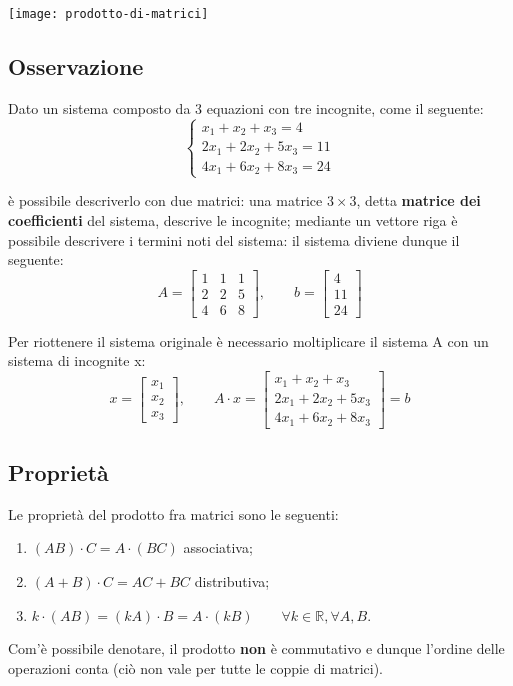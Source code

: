 		\texttt{[image: prodotto-di-matrici]}
		
		\subsection{Osservazione}
			Dato un sistema composto da 3 equazioni con tre incognite, come il seguente:
			$$
			\begin{cases}
				x_1 + x_2 + x_3 = 4 \\
				2x_1 + 2x_2 + 5x_3 = 11 \\
				4x_1 + 6x_2 + 8x_3 = 24 
			\end{cases}
			$$
			
			è possibile descriverlo con due matrici: una matrice $ 3 \times 3 $, detta \textbf{matrice dei coefficienti} del sistema, descrive le incognite; mediante un vettore riga è possibile descrivere i termini noti del sistema: il sistema diviene dunque il seguente:
			$$
			A = 
			\begin{bmatrix}
				1 & 1 & 1 \\
				2 & 2 & 5 \\
				4 & 6 & 8
			\end{bmatrix}, \qquad
			b = 
			\begin{bmatrix}
				4 \\
				11 \\
				24
			\end{bmatrix}
			$$
			
			Per riottenere il sistema originale è necessario moltiplicare il sistema A con un sistema di incognite x:
			$$
			x =
			\begin{bmatrix}
				x_1 \\
				x_2 \\
				x_3
			\end{bmatrix}, \qquad
			A \cdot x =
			\begin{bmatrix}
				x_1 + x_2 + x_3 \\
				2x_1 + 2x_2 + 5x_3 \\
				4x_1 + 6x_2 + 8x_3
			\end{bmatrix}
			= b
			$$
		
		\subsection{Proprietà}
			Le proprietà del prodotto fra matrici sono le seguenti:
			\begin{enumerate}
				\item $ (AB) \cdot C = A \cdot (BC) $  associativa;
				\item $ (A + B) \cdot C = AC + BC $ distributiva;
				\item $ k \cdot (AB) = (kA) \cdot B = A \cdot (kB) \qquad \forall k \in \mathbb{R}, \forall A, B $.
			\end{enumerate}
			Com'è possibile denotare, il prodotto \textbf{non} è commutativo e dunque l'ordine delle operazioni conta (ciò non vale per tutte le coppie di matrici).
			
